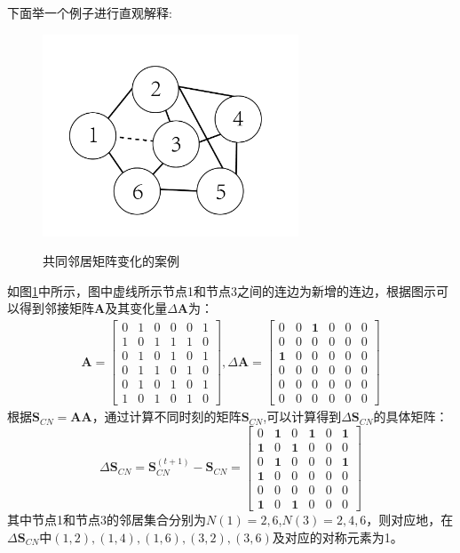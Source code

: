 下面举一个例子进行直观解释:
\begin{figure}[!ht]
	\begin{center}
	{\includegraphics[width=3in]{figures/CN_incremental.png}}
	\caption{共同邻居矩阵变化的案例}
	\label{fig:case_for_lemma}
	\end{center}
\end{figure}
如图\ref{fig:case_for_lemma}中所示，图中虚线所示节点1和节点3之间的连边为新增的连边，根据图示可以得到邻接矩阵$\textbf{A}$及其变化量$\Delta\textbf{A}$为：
\begin{equation}
\begin{matrix}
	\textbf{A} = \begin{bmatrix}
	0&1&0&0&0&1 \\
	1&0&1&1&1&0\\
	0&1&0&1&0&1 \\
	0&1&1&0&1&0\\
	0&1&0&1&0&1\\
	1&0&1&0&1&0
	\end{bmatrix} ,
	\Delta\textbf{A} = \begin{bmatrix}
	0&0&\textbf{1}&0&0&0 \\
	0&0&0&0&0&0\\
	\textbf{1}&0&0&0&0&0 \\
	0&0&0&0&0&0\\
	0&0&0&0&0&0\\
	0&0&0&0&0&0
	\end{bmatrix}
\end{matrix}
\end{equation}
根据$\textbf{S}_{CN} = \textbf{A}\textbf{A}$，通过计算不同时刻的矩阵$\textbf{S}_{CN}$,可以计算得到$\Delta \textbf{S}_{CN}$的具体矩阵：
\begin{equation}
\Delta \textbf{S}_{CN} = \textbf{S}_{CN}^{(t+1)}- \textbf{S}_{CN} = \begin{bmatrix}
0&\textbf{1}&0&\textbf{1}&0&\textbf{1} \\
\textbf{1}&0&\textbf{1}&0&0&0\\
0&\textbf{1}&0&0&0&\textbf{1} \\
\textbf{1}&0&0&0&0&0\\
0&0&0&0&0&0\\
\textbf{1}&0&\textbf{1}&0&0&0
\end{bmatrix}
\end{equation}
其中节点1和节点3的邻居集合分别为$N(1) = {2,6}$,$N(3) = {2,4,6}$，则对应地，在$\Delta \textbf{S}_{CN}$中$(1,2),(1,4),(1,6),(3,2),(3,6)$及对应的对称元素为1。

